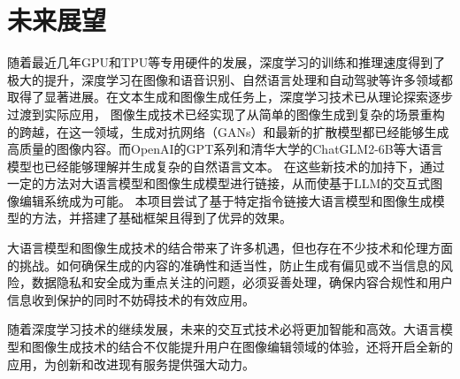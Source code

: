 \documentclass[a4paper,AutoFakeBold,oneside,12pt]{book}
\begin{document}
\section{未来展望}
随着最近几年GPU和TPU等专用硬件的发展，深度学习的训练和推理速度得到了极大的提升，深度学习在图像和语音识别、自然语言处理和自动驾驶等许多领域都取得了显著进展。在文本生成和图像生成任务上，深度学习技术已从理论探索逐步过渡到实际应用，
图像生成技术已经实现了从简单的图像生成到复杂的场景重构的跨越，在这一领域，生成对抗网络（GANs）和最新的扩散模型都已经能够生成高质量的图像内容。而OpenAI的GPT系列和清华大学的ChatGLM2-6B等大语言模型也已经能够理解并生成复杂的自然语言文本。
在这些新技术的加持下，通过一定的方法对大语言模型和图像生成模型进行链接，从而使基于LLM的交互式图像编辑系统成为可能。
本项目尝试了基于特定指令链接大语言模型和图像生成模型的方法，并搭建了基础框架且得到了优异的效果。

大语言模型和图像生成技术的结合带来了许多机遇，但也存在不少技术和伦理方面的挑战。如何确保生成的内容的准确性和适当性，防止生成有偏见或不当信息的风险，数据隐私和安全成为重点关注的问题，必须妥善处理，确保内容合规性和用户信息收到保护的同时不妨碍技术的有效应用。

随着深度学习技术的继续发展，未来的交互式技术必将更加智能和高效。大语言模型和图像生成技术的结合不仅能提升用户在图像编辑领域的体验，还将开启全新的应用，为创新和改进现有服务提供强大动力。



\end{document}
